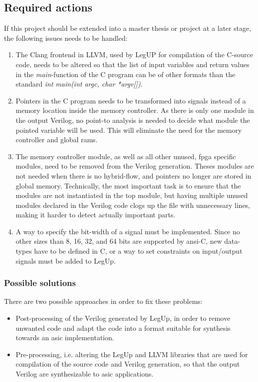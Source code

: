 \subsection{Required actions}
\label{subsec:reqact}
If this project should be extended into a master thesis or project at a later stage, the following issues needs to be handled:
\begin{enumerate}
    \item \label{item:futworkprob}The Clang frontend in LLVM, used by LegUP for compilation of the C-source code, needs to be altered so that the list of input variables and return values in the \textit{main}-function of the C program can be of other formats than the standard \textit{int main(int argc, char *argv[])}.
    \item Pointers in the C program needs to be transformed into signals instead of a memory location inside the memory controller. As there is only one module in the output Verilog, no point-to analysis is needed to decide what module the pointed variable will be used. This will eliminate the need for the memory controller and global \gls{ram}s.
    \item The memory controller module, as well as all other unused, \gls{fpga} specific modules, need to be removed from the Verilog generation. Theses modules are not needed when there is no hybrid-flow, and pointers no longer are stored in global memory. Technically, the most important task is to ensure that the modules are not instantiated in the top module, but having multiple unused modules declared in the Verilog code clogs up the file with unnecessary lines, making it harder to detect actually important parts.
    \item A way to specify the bit-width of a signal must be implemented. Since no other sizes than 8, 16, 32, and 64 bits are supported by \gls{ansi}-C, new data-types have to be defined in C, or a way to set constraints on input/output signals must be added to LegUp.
\end{enumerate}

\subsubsection{Possible solutions}

There are two possible approaches in order to fix these problems:
\begin{itemize}
\item Post-processing of the Verilog generated by LegUp, in order to remove unwanted code and adapt the code into a format suitable for synthesis towards an \gls{asic} implementation.
\item Pre-processing, i.e. altering the LegUp and LLVM libraries that are used for compilation of the source code and Verilog generation, so that the output Verilog are synthesizable to \gls{asic} applications.
\end{itemize}

